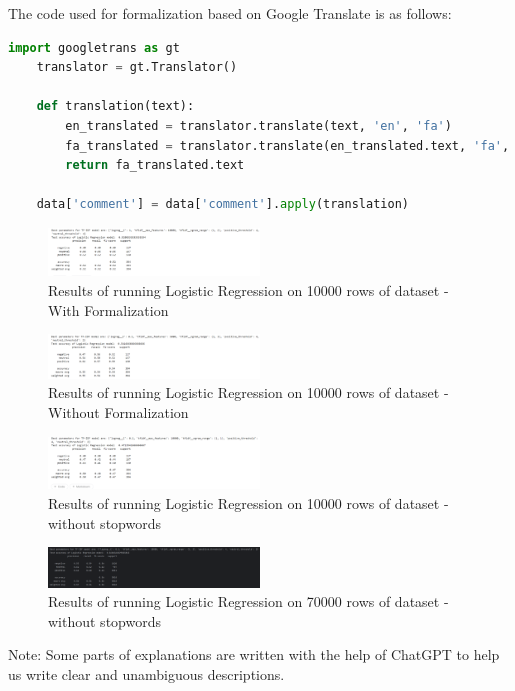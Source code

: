 \documentclass{solutionclass} %
\begin{document}
The code used for formalization based on Google Translate is as follows:

\begin{lstlisting}[language=Python]
    import googletrans as gt
    translator = gt.Translator()
    
    def translation(text):
        en_translated = translator.translate(text, 'en', 'fa')
        fa_translated = translator.translate(en_translated.text, 'fa', 'en')
        return fa_translated.text
    
    data['comment'] = data['comment'].apply(translation)
\end{lstlisting}



\begin{figure}[h!]
    \caption{Results of running Logistic Regression on 10000 rows of dataset - With Formalization}
    \centering
    \includegraphics[width=0.5\textwidth]{img/10k_Form.png}
\end{figure}


\begin{figure}[h!]
    \caption{Results of running Logistic Regression on 10000 rows of dataset - Without Formalization}
    \centering
    \includegraphics[width=0.5\textwidth]{img/10k_NoForm.png}
\end{figure}



\begin{figure}[h!]
    \caption{Results of running Logistic Regression on 10000 rows of dataset - without stopwords}
    \centering
    \includegraphics[width=0.5\textwidth]{img/10k_NoSW.png}
\end{figure}


\begin{figure}[h!]
    \caption{Results of running Logistic Regression on 70000 rows of dataset - without stopwords}
    \centering
    \includegraphics[width=0.5\textwidth]{img/70k_NoSW.png}
\end{figure}



Note: Some parts of explanations are written with the help of ChatGPT to help us write clear and unambiguous descriptions.
\end{document}
